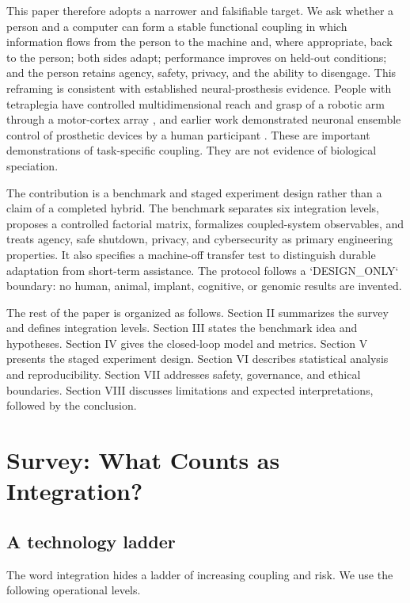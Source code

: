\documentclass[conference]{IEEEtran}
\begin{document}
This paper therefore adopts a narrower and falsifiable target. We ask whether a person and a computer can form a stable functional coupling in which information flows from the person to the machine and, where appropriate, back to the person; both sides adapt; performance improves on held-out conditions; and the person retains agency, safety, privacy, and the ability to disengage. This reframing is consistent with established neural-prosthesis evidence. People with tetraplegia have controlled multidimensional reach and grasp of a robotic arm through a motor-cortex array \cite{hochberg2012}, and earlier work demonstrated neuronal ensemble control of prosthetic devices by a human participant \cite{hochberg2006}. These are important demonstrations of task-specific coupling. They are not evidence of biological speciation.

The contribution is a benchmark and staged experiment design rather than a claim of a completed hybrid. The benchmark separates six integration levels, proposes a controlled factorial matrix, formalizes coupled-system observables, and treats agency, safe shutdown, privacy, and cybersecurity as primary engineering properties. It also specifies a machine-off transfer test to distinguish durable adaptation from short-term assistance. The protocol follows a `DESIGN\_ONLY` boundary: no human, animal, implant, cognitive, or genomic results are invented.

The rest of the paper is organized as follows. Section II summarizes the survey and defines integration levels. Section III states the benchmark idea and hypotheses. Section IV gives the closed-loop model and metrics. Section V presents the staged experiment design. Section VI describes statistical analysis and reproducibility. Section VII addresses safety, governance, and ethical boundaries. Section VIII discusses limitations and expected interpretations, followed by the conclusion.

\section{Survey: What Counts as Integration?}

\subsection{A technology ladder}

The word integration hides a ladder of increasing coupling and risk. We use the following operational levels.
\end{document}
